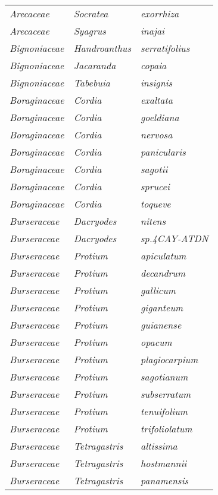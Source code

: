 \documentclass[fleqn,10pt]{ArtEcoFoG} %
\renewenvironment{table}{\begin{table*}}{\end{table*}\ignorespacesafterend}
\begin{document}
\begin{table}
\begin{tabular}[t]{lll}
\em{Arecaceae} & \em{Socratea} & \em{exorrhiza}\\
\em{Arecaceae} & \em{Syagrus} & \em{inajai}\\
\em{Bignoniaceae} & \em{Handroanthus} & \em{serratifolius}\\
\addlinespace
\em{Bignoniaceae} & \em{Jacaranda} & \em{copaia}\\
\em{Bignoniaceae} & \em{Tabebuia} & \em{insignis}\\
\em{Boraginaceae} & \em{Cordia} & \em{exaltata}\\
\em{Boraginaceae} & \em{Cordia} & \em{goeldiana}\\
\em{Boraginaceae} & \em{Cordia} & \em{nervosa}\\
\addlinespace
\em{Boraginaceae} & \em{Cordia} & \em{panicularis}\\
\em{Boraginaceae} & \em{Cordia} & \em{sagotii}\\
\em{Boraginaceae} & \em{Cordia} & \em{sprucei}\\
\em{Boraginaceae} & \em{Cordia} & \em{toqueve}\\
\em{Burseraceae} & \em{Dacryodes} & \em{nitens}\\
\addlinespace
\em{Burseraceae} & \em{Dacryodes} & \em{sp.4CAY-ATDN}\\
\em{Burseraceae} & \em{Protium} & \em{apiculatum}\\
\em{Burseraceae} & \em{Protium} & \em{decandrum}\\
\em{Burseraceae} & \em{Protium} & \em{gallicum}\\
\em{Burseraceae} & \em{Protium} & \em{giganteum}\\
\addlinespace
\em{Burseraceae} & \em{Protium} & \em{guianense}\\
\em{Burseraceae} & \em{Protium} & \em{opacum}\\
\em{Burseraceae} & \em{Protium} & \em{plagiocarpium}\\
\em{Burseraceae} & \em{Protium} & \em{sagotianum}\\
\em{Burseraceae} & \em{Protium} & \em{subserratum}\\
\addlinespace
\em{Burseraceae} & \em{Protium} & \em{tenuifolium}\\
\em{Burseraceae} & \em{Protium} & \em{trifoliolatum}\\
\em{Burseraceae} & \em{Tetragastris} & \em{altissima}\\
\em{Burseraceae} & \em{Tetragastris} & \em{hostmannii}\\
\em{Burseraceae} & \em{Tetragastris} & \em{panamensis}\\

\end{tabular}
\end{table}
\end{document}
